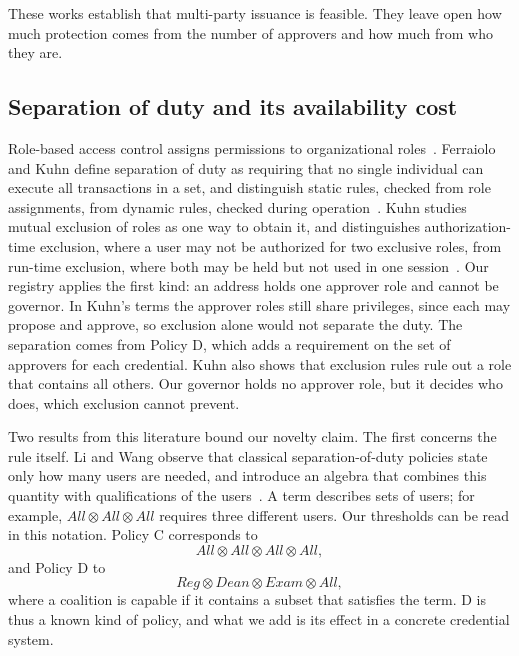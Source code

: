 These works establish that multi-party issuance is feasible. They leave open how much protection comes from the number of approvers and how much from who they are.

\subsection{Separation of duty and its availability cost}
Role-based access control assigns permissions to organizational roles~\cite{ferraiolo1992,sandhu2000}. Ferraiolo and Kuhn define separation of duty as requiring that no single individual can execute all transactions in a set, and distinguish static rules, checked from role assignments, from dynamic rules, checked during operation~\cite{ferraiolo1992}. Kuhn studies mutual exclusion of roles as one way to obtain it, and distinguishes authorization-time exclusion, where a user may not be authorized for two exclusive roles, from run-time exclusion, where both may be held but not used in one session~\cite{kuhn1997}. Our registry applies the first kind: an address holds one approver role and cannot be governor. In Kuhn's terms the approver roles still share privileges, since each may propose and approve, so exclusion alone would not separate the duty. The separation comes from Policy D, which adds a requirement on the set of approvers for each credential. Kuhn also shows that exclusion rules rule out a role that contains all others. Our governor holds no approver role, but it decides who does, which exclusion cannot prevent.

Two results from this literature bound our novelty claim. The first concerns the rule itself. Li and Wang observe that classical separation-of-duty policies state only how many users are needed, and introduce an algebra that combines this quantity with qualifications of the users~\cite{li2008}. A term describes sets of users; for example, $\mathit{All}\otimes\mathit{All}\otimes\mathit{All}$ requires three different users. Our thresholds can be read in this notation. Policy C corresponds to
\begin{equation}
\mathit{All}\otimes\mathit{All}\otimes\mathit{All}\otimes\mathit{All},
\end{equation}
and Policy D to
\begin{equation}
\mathit{Reg}\otimes\mathit{Dean}\otimes\mathit{Exam}\otimes\mathit{All},
\end{equation}
where a coalition is capable if it contains a subset that satisfies the term. D is thus a known kind of policy, and what we add is its effect in a concrete credential system.


